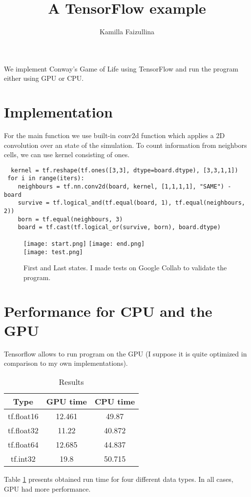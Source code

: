 \documentclass{article}
\title{A TensorFlow example}
\author{ Kamilla Faizullina}
\date{\empty}
\begin{document}
\maketitle
  We implement Conway’s Game of Life using TensorFlow and run the program either using GPU or CPU.
 

\section{Implementation}
 For the main function we use built-in conv2d function which applies a 2D convolution over an  state of the simulation. 
 To count information from neighbors cells, we can use kernel consisting of ones. 
 \begin{verbatim}
  kernel = tf.reshape(tf.ones([3,3], dtype=board.dtype), [3,3,1,1])
 for i in range(iters):      
 	neighbours = tf.nn.conv2d(board, kernel, [1,1,1,1], "SAME") - board
 	survive = tf.logical_and(tf.equal(board, 1), tf.equal(neighbours, 2))
 	born = tf.equal(neighbours, 3)
 	board = tf.cast(tf.logical_or(survive, born), board.dtype)
 \end{verbatim}
 \begin{figure}[hp]
 	\texttt{[image: start.png]} 
 	\texttt{[image: end.png]}  \\
 	\texttt{[image: test.png]} 
 	\caption{ First and Last states. I made tests on Google Collab to validate the program.  }
 	\label{states}
 \end{figure}






\section{ Performance for CPU and the GPU }
 Tensorflow allows to run program on the GPU (I suppose it is quite optimized in comparison to my own implementations).
 
\begin{table}[htp]
	\centering
	\begin{tabular}{||c c c   ||} 
		\hline
		Type  & GPU time  &  CPU time   \\ [0.5ex] 
		\hline\hline
		 tf.float16 & 12.461 & 49.87 \\ 
		tf.float32 &   11.22 & 40.872 \\ 
		tf.float64 & 12.685 & 44.837 \\
		 tf.int32 & 19.8 &50.715 \\	[1ex] 
		\hline
	\end{tabular}
	\caption{Results }
	\label{table:2}
\end{table}

Table \ref{table:2} presents obtained run time for four different data types. In all cases, GPU had more performance.  
 
 

 

\end{document}
